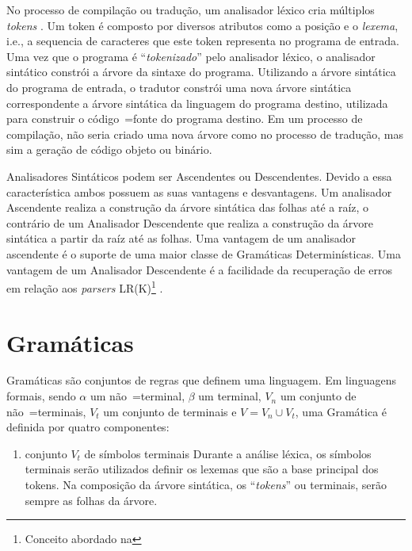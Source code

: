 {    No processo de compilação ou tradução,
    um analisador léxico cria múltiplos \textit{tokens} \cite{ahoCompilerDragonBook}.
    Um token é composto por diversos atributos como a posição e
    o \textit{lexema}, i.e.,
    a sequencia de caracteres que este token representa no programa de entrada.
    Uma vez que o programa é ``\textit{tokenizado}'' pelo analisador léxico,
    o analisador sintático constrói a árvore da sintaxe do programa.
    Utilizando a árvore sintática do programa de entrada,
    o tradutor constrói uma nova árvore sintática correspondente a
    árvore sintática da linguagem do programa destino,
    utilizada para construir o código~=fonte do programa destino.
    Em um processo de compilação,
    não seria criado uma nova árvore como no processo de tradução,
    mas sim a geração de código objeto ou binário.

    Analisadores Sintáticos podem ser Ascendentes ou Descendentes.
    Devido a essa característica ambos possuem as suas vantagens e
    desvantagens.
    Um analisador Ascendente realiza a construção da árvore sintática das folhas até a raíz,
    o contrário de um Analisador Descendente que realiza a construção
    da árvore sintática a partir da raíz até as folhas.
    Uma vantagem de um analisador ascendente é o suporte
    de uma maior classe de Gramáticas Determinísticas.
    Uma vantagem de um Analisador Descendente é a facilidade da recuperação de erros
    em relação aos \textit{parsers} LR(K)\footnote{Conceito abordado na
    } \cite{sippu1982,lr1ErrorRecovery,larkJosefGrosch}.


\section{Gramáticas}

    Gramáticas são conjuntos de regras que definem uma linguagem.
    Em linguagens formais,
    sendo $\alpha$ um não~=terminal,
    $\beta$ um terminal,
    $V_n$ um conjunto de não~=terminais,
    $V_t$ um conjunto de terminais e
    $V = V_n \cup V_t$,
    uma Gramática é definida por quatro componentes:
    \begin{enumerate}%
        \item {} conjunto $V_t$ de símbolos terminais
        Durante a análise léxica,
        os símbolos terminais serão utilizados definir os lexemas que são a base principal dos tokens.
        Na composição da árvore sintática,
        os ``\textit{tokens}'' ou terminais,
        serão sempre as folhas da árvore.


\end{enumerate}}
